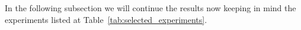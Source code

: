 In the following subsection we will continue the results now keeping in mind the experiments listed at Table~\ref{tab:selected_experiments}.






